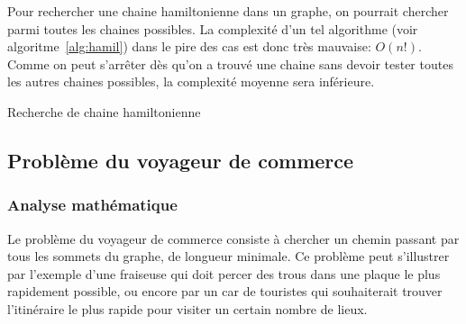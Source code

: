     Pour rechercher une chaine hamiltonienne dans un graphe, on pourrait
    chercher parmi toutes les chaines possibles. La complexité d'un tel
    algorithme (voir algoritme~\ref{alg:hamil}) dans le pire des cas est donc
    très mauvaise: $O(n!)$. Comme on peut s'arrêter dès qu'on a trouvé une
    chaine sans devoir tester toutes les autres chaines possibles, la
    complexité moyenne sera inférieure.

    \begin{algorithm}

      \caption{Recherche de chaine hamiltonienne}
      \label{alg:hamil}
    \end{algorithm}

\subsection{Problème du voyageur de commerce}\label{sec:tsp}
  \subsubsection{Analyse mathématique}
    Le problème du voyageur de commerce consiste à chercher un chemin passant
    par tous les sommets du graphe, de longueur minimale.
    Ce problème peut s'illustrer par l'exemple d'une
    fraiseuse qui doit percer des trous dans une plaque le plus
    rapidement possible, ou encore par un car de touristes qui souhaiterait
    trouver l'itinéraire le plus rapide pour visiter un certain nombre de lieux.

